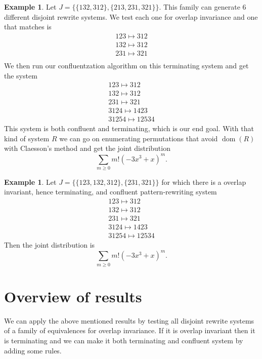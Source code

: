 \documentclass[a4paper, 11pt, english]{article}
\newcommand{\patternrule}{ \mapsto \!}
\theoremstyle{definition}
\newtheorem{example}[theorem]{Example}
\DeclareMathOperator{\dom}{dom}
\begin{document}
\begin{example}
Let $J=\{\{ 132, 312 \}, \{ 213, 231, 321 \}\}$. This family can generate 6
different disjoint rewrite systems. We test each one for overlap invariance and one that
matches is 
\[
    \begin{matrix}
        123 \patternrule 312 \\
        132 \patternrule 312 \\
        231 \patternrule 321 \\
    \end{matrix}
\]
We then run our confluentzation algorithm on this terminating system
and get the system
\[
    \begin{matrix}
        123 \patternrule 312 \\
        132 \patternrule 312 \\
        231 \patternrule 321 \\
        3124 \patternrule 1423 \\
        31254 \patternrule 12534
    \end{matrix}
\]
This system is both confluent and terminating, which is our end goal.
With that kind of system $R$ we can go on enumerating
permutations that avoid $\dom(R)$ with Claesson's method and get the joint distribution
\[
  \sum_{m \geq 0} m! (-3x^3 + x)^m.
\]
 
\end{example}

\begin{example}
Let $J = \{ \{ 123, 132, 312 \}, \{ 231, 321 \} \}$ for which there is a overlap invariant, hence
terminating, and confluent pattern-rewriting system
\[
    \begin{matrix}
        123 \patternrule 312 \\
        132 \patternrule 312 \\
        231 \patternrule 321 \\
        3124 \patternrule 1423 \\
        31254 \patternrule 12534
    \end{matrix}
\]
Then the joint distribution is
\[
  \sum_{m \geq 0} m! (-3x^3 + x)^m.
\]

\end{example}

\section{Overview of results}
We can apply the above mentioned results by testing all disjoint rewrite systems of a
family of equivalences for overlap invariance. If it is overlap invariant then it is terminating and
we can make it both terminating and confluent system by adding some rules.
\end{document}
